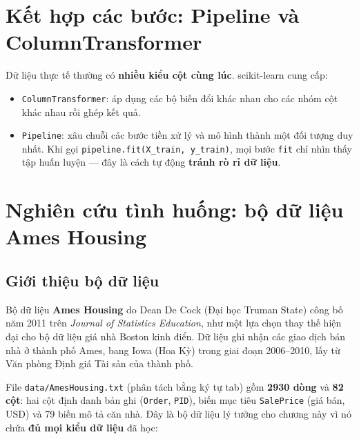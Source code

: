 \section{Kết hợp các bước: Pipeline và ColumnTransformer}

Dữ liệu thực tế thường có \textbf{nhiều kiểu cột cùng lúc}. scikit-learn cung cấp:
\begin{itemize}
    \item \texttt{ColumnTransformer}: áp dụng các bộ biến đổi khác nhau cho các nhóm cột khác nhau rồi ghép kết quả.
    \item \texttt{Pipeline}: xâu chuỗi các bước tiền xử lý và mô hình thành một đối tượng duy nhất. Khi gọi \texttt{pipeline.fit(X\_train, y\_train)}, mọi bước \texttt{fit} chỉ nhìn thấy tập huấn luyện --- đây là cách tự động \textbf{tránh rò rỉ dữ liệu}.
\end{itemize}


\section{Nghiên cứu tình huống: bộ dữ liệu Ames Housing}
\label{sec:ames-case}

\subsection{Giới thiệu bộ dữ liệu}

Bộ dữ liệu \textbf{Ames Housing} do Dean De Cock (Đại học Truman State) công bố năm 2011 trên \textit{Journal of Statistics Education}, như một lựa chọn thay thế hiện đại cho bộ dữ liệu giá nhà Boston kinh điển. Dữ liệu ghi nhận các giao dịch bán nhà ở thành phố Ames, bang Iowa (Hoa Kỳ) trong giai đoạn 2006--2010, lấy từ Văn phòng Định giá Tài sản của thành phố.

File \texttt{data/AmesHousing.txt} (phân tách bằng ký tự tab) gồm \textbf{2930 dòng} và \textbf{82 cột}: hai cột định danh bản ghi (\texttt{Order}, \texttt{PID}), biến mục tiêu \texttt{SalePrice} (giá bán, USD) và 79 biến mô tả căn nhà. Đây là bộ dữ liệu lý tưởng cho chương này vì nó chứa \textbf{đủ mọi kiểu dữ liệu} đã học:

